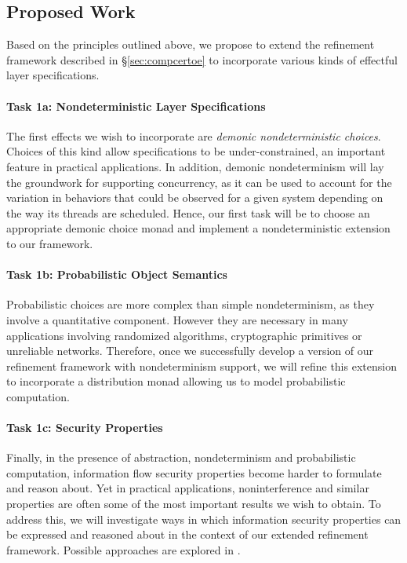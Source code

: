 \subsection{Proposed Work}

Based on the principles outlined above,
we propose to extend the refinement framework
described in \S\ref{sec:compcertoe}
to incorporate various kinds of
effectful layer specifications.

\paragraph{Task 1a: Nondeterministic Layer Specifications}
\label{ssec:effects:work}

The first effects we wish to incorporate are
\emph{demonic nondeterministic choices}.
Choices of this kind allow specifications to be under-constrained,
an important feature in practical applications.
In addition,
demonic nondeterminism will lay the groundwork for
supporting concurrency,
as it can be used to account for the
variation in behaviors that could be observed
for a given system
depending on the way its threads are scheduled.
Hence,
our first task will be to
choose an appropriate demonic choice monad
and implement a nondeterministic extension
to our framework.

\paragraph{Task 1b: Probabilistic Object Semantics}

Probabilistic choices are more complex than simple nondeterminism,
as they involve a quantitative component.
However they are necessary in many applications
involving randomized algorithms, cryptographic primitives or
unreliable networks.
Therefore,
once we successfully develop a version of our refinement framework
with nondeterminism support,
we will refine this extension to incorporate
a distribution monad allowing us to model probabilistic computation.

\paragraph{Task 1c: Security Properties}

Finally,
in the presence of abstraction, nondeterminism and probabilistic computation,
information flow security properties become
harder to formulate and reason about.
Yet in practical applications,
noninterference and similar properties
are often some of the most important results we wish to obtain.
To address this,
we will investigate ways in which information security properties
can be expressed and reasoned about
in the context of our extended refinement framework.
Possible approaches are explored in \cite[\S{}II]{yuyang}.

